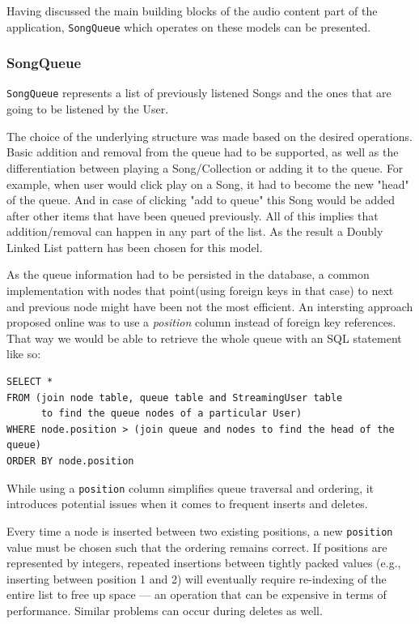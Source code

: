 Having discussed the main building blocks of the audio content part of the application,
\texttt{SongQueue} which operates on these models can be presented.

\subsubsection{SongQueue}
\texttt{SongQueue} represents a list of previously listened Songs and the ones that are going to be
listened by the User.

The choice of the underlying structure was made based on the desired operations.
Basic addition and removal from the queue had to be supported, as well as the differentiation
between playing a Song/Collection or adding it to the queue.
For example, when user would click play on a Song, it had to become the new "head" of the queue.
And in case of clicking "add to queue" this Song would be added after other items
that have been queued previously. All of this implies that addition/removal can happen in any part
of the list. As the result a Doubly Linked List pattern has been chosen for this model.

As the queue information had to be persisted in the database, a common implementation with
nodes that point(using foreign keys in that case) to next and previous node might have been
not the most efficient. An intersting approach proposed online was to use a \textit{position} column
instead of foreign key references. That way we would be able to retrieve the whole queue with an SQL statement
like so:

\begin{verbatim}
SELECT *
FROM (join node table, queue table and StreamingUser table
      to find the queue nodes of a particular User)
WHERE node.position > (join queue and nodes to find the head of the queue)
ORDER BY node.position
\end{verbatim}

While using a \texttt{position} column simplifies queue traversal and ordering, it introduces potential
issues when it comes to frequent inserts and deletes.

Every time a node is inserted between two existing positions, a new \texttt{position} value must be chosen
such that the ordering remains correct. If positions are represented by integers, repeated insertions
between tightly packed values (e.g., inserting between position 1 and 2) will eventually require
re-indexing of the entire list to free up space — an operation that can be expensive in terms of performance.
Similar problems can occur during deletes as well.

